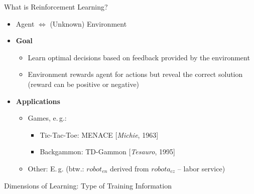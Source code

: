 \begin{frame}{What is Reinforcement Learning?}{}
	\begin{itemize}
		\item Agent $\Leftrightarrow$ (Unknown) Environment
		\item \textbf{Goal}
		\begin{itemize}
			\item Learn optimal decisions based on feedback provided by the environment
			\item Environment rewards agent for actions but  reveal the correct solution
				(reward can be positive or negative)
		\end{itemize}
		\item \textbf{Applications}
		\begin{itemize}
			\item Games, e.\,g.:
			\begin{itemize}
				\item Tic-Tac-Toe: MENACE [\textit{Michie}, 1963]
				\item Backgammon: TD-Gammon [\textit{Tesauro}, 1995]
			\end{itemize}
			\item Other: E.\,g. 
				\href{https://www.youtube.com/watch?v=W_gxLKSsSIE}{}
				\scriptsize (btw.: $robot_{en}$ derived from $robota_{cz}$ -- labor service)
		\end{itemize}
	\end{itemize}
\end{frame}


\begin{frame}{Dimensions of Learning: Type of Training Information}{}
	
\end{frame}


